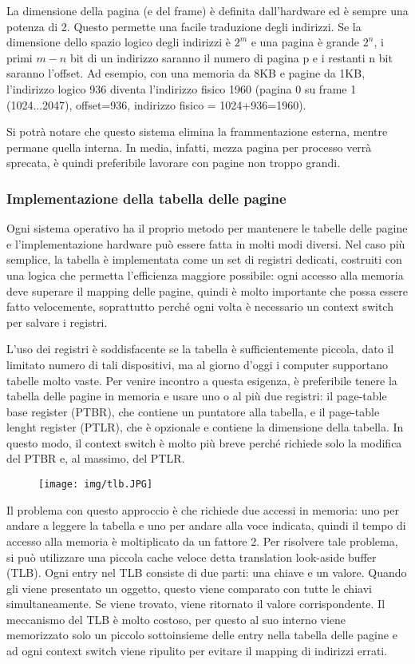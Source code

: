 \documentclass[a4]{article}
\begin{document}
La dimensione della pagina (e del frame) è definita dall'hardware ed è sempre una potenza di 2. Questo permette una facile traduzione degli indirizzi. Se la dimensione dello spazio logico degli indirizzi è $2^m$ e una pagina è grande $2^n$, i primi $m-n$ bit di un indirizzo saranno il numero di pagina p e i restanti n bit saranno l'offset. Ad esempio, con una memoria da 8KB e pagine da 1KB, l'indirizzo logico 936 diventa l'indirizzo fisico 1960 (pagina 0 su frame 1 (1024...2047), offset=936, indirizzo fisico = 1024+936=1960).

Si potrà notare che questo sistema elimina la frammentazione esterna, mentre permane quella interna. In media, infatti, mezza pagina per processo verrà sprecata, è quindi preferibile lavorare con pagine non troppo grandi.

\subsubsection{Implementazione della tabella delle pagine}
Ogni sistema operativo ha il proprio metodo per mantenere le tabelle delle pagine e l'implementazione hardware può essere fatta in molti modi diversi. Nel caso più semplice, la tabella è implementata come un set di registri dedicati, costruiti con una logica che permetta l'efficienza maggiore possibile: ogni accesso alla memoria deve superare il mapping delle pagine, quindi è molto importante che possa essere fatto velocemente, soprattutto perché ogni volta è necessario un context switch per salvare i registri.

L'uso dei registri è soddisfacente se la tabella è sufficientemente piccola, dato il limitato numero di tali dispositivi, ma al giorno d'oggi i computer supportano tabelle molto vaste. Per venire incontro a questa esigenza, è preferibile tenere la tabella delle pagine in memoria e usare uno o al più due registri: il page-table base register (PTBR), che contiene un puntatore alla tabella, e il page-table lenght register (PTLR), che è opzionale e contiene la dimensione della tabella. In questo modo, il context switch è molto più breve perché richiede solo la modifica del PTBR e, al massimo, del PTLR.

\begin{figure}[h!]
    \centering
    \texttt{[image: img/tlb.JPG]}
\end{figure}

Il problema con questo approccio è che richiede due accessi in memoria: uno per andare a leggere la tabella e uno per andare alla voce indicata, quindi il tempo di accesso alla memoria è moltiplicato da un fattore 2. Per risolvere tale problema, si può utilizzare una piccola cache veloce detta translation look-aside buffer (TLB). Ogni entry nel TLB consiste di due parti: una chiave e un valore.  Quando gli viene presentato un oggetto, questo viene comparato con tutte le chiavi simultaneamente. Se viene trovato, viene ritornato il valore corrispondente.
Il meccanismo del TLB è molto costoso, per questo al suo interno viene memorizzato solo un piccolo sottoinsieme delle entry nella tabella delle pagine e ad ogni context switch viene ripulito per evitare il mapping di indirizzi errati.
\end{document}
